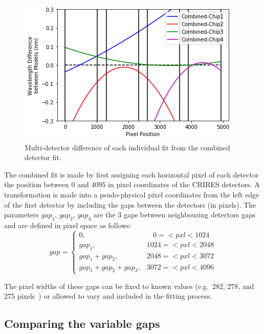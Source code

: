 \begin{figure}
    \includegraphics[width=0.75\linewidth]{./figures/appendix/multidector_fit_diff}
    \caption[Multi-detector difference of combined fit to the individual fits.]{Multi-detector difference of each individual fit from the combined detector fit.}
    \label{fig:multidectorfitdiff}
\end{figure}

The combined fit is made by first assigning each horizontal pixel of each detector the position between 0 and 4095 in pixel coordinates of the {CRIRES} detectors.
A transformation is made into a psudo-physical pixel coordinates from the left edge of the first detector by including the gaps between the detectors (in pixels).
The parameters \(gap_{1}\), \(gap_{2}\), \(gap_{3}\) are the 3 gaps between neighbouring detectors gaps and are defined in pixel space as follows:
\[
gap =\begin{cases}
0,                       & ~~~~0=<pxl<1024\\
gap_1,                    & 1024=<pxl<2048\\
gap_1 + gap_2,             & 2048=<pxl<3072\\
gap_1 + gap_2 + gap_3,      & 3072=<pxl<4096
\end{cases}
\]

The pixel widths of these gaps can be fixed to known values (e.g.\ 282, 278, and 275 pixels~\citep{brogi_rotation_2016}) or allowed to vary and included in the fitting process.


\subsection{Comparing the variable gaps}




